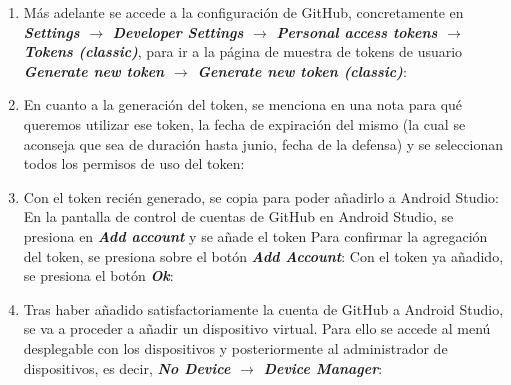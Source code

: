 \begin{enumerate}
        \item Más adelante se accede a la configuración de GitHub, concretamente
        en \textit{\textbf{Settings $\rightarrow$ Developer Settings
        $\rightarrow$ Personal access tokens $\rightarrow$ Tokens (classic)}},
        para ir a la página de muestra de tokens de usuario \textit{\textbf{Generate new
        token $\rightarrow$ Generate new token (classic)}}:
        \item En cuanto a la generación del token, se menciona en una nota para qué queremos utilizar ese token, la fecha de expiración del mismo (la cual se aconseja que sea de duración hasta junio, fecha de la defensa) y se seleccionan todos los permisos de uso del token:
        \item Con el token recién generado, se copia para poder añadirlo a Android Studio:
        En la pantalla de control de cuentas de GitHub en Android Studio, se presiona en \textit{\textbf{Add account}} y se añade el token
        Para confirmar la agregación del token, se presiona sobre el botón \textit{\textbf{Add Account}}:
        Con el token ya añadido, se presiona el botón \textit{\textbf{Ok}}:
        \item Tras haber añadido satisfactoriamente la cuenta de GitHub a Android Studio, se va a proceder a añadir un dispositivo virtual. Para ello se accede al menú desplegable con los dispositivos y posteriormente al administrador de dispositivos, es decir, \textit{\textbf{No Device $\rightarrow$ Device Manager}}:

\end{enumerate}
